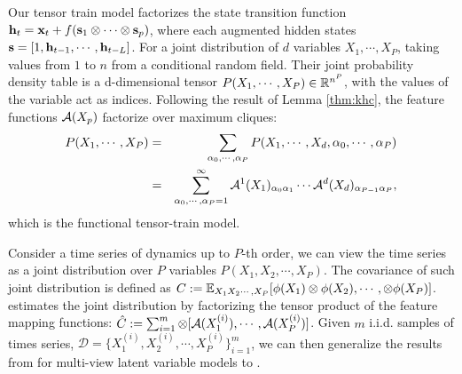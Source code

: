 
Our tensor train model factorizes the state transition function  
${\mathbf{h}}_t = {\mathbf{x}}_t+  f({\mathbf{s}}_1 \otimes \cdots \otimes {\mathbf{s}}_p)$, where each augmented hidden states ${\mathbf{s}} =  [1, {\mathbf{h}}_{t-1}, \cdots, {\mathbf{h}}_{t-L}]$. 
%
For a joint distribution of $d$ variables  $X_1, \cdots, X_P$, taking values from $1$ to $n$ from a conditional random field. Their joint probability density table is a d-dimensional tensor $P(X_1, \cdots, X_P) \in {\mathbb R}^{n^P}$, with the values of the variable act as indices. Following the result  of Lemma \ref{thm:khc},  the feature  functions  ${\mathcal{A}}(X_p)$ factorize over maximum cliques:
\begin{eqnarray*}
P(X_1,\cdots, X_P)&=& \sum_{\alpha_0, \cdots, \alpha_P}P(X_1,\cdots,X_d,\alpha_0,\cdots, \alpha_P)\\
&=& \sum_{\alpha_0,\cdots,\alpha_P=1}^\infty
%
\T{A}^1 (X_1)_{\alpha_0 \alpha_1}
%
\cdots
%
\T{A}^d(X_d)_{\alpha_{P-1}	 \alpha_P},
\end{eqnarray*}
which is the functional tensor-train model.




Consider a time series of dynamics up to $P$-th order,  we can view the time series as a joint distribution over  $P$ variables  $P(X_1, X_2, \cdots, X_P)$.   The covariance of such joint distribution is defined as  $C := {\mathbb E}_{X_1 X_2 \cdots,  X_P}[\phi(X_1)\otimes \phi(X_2), \cdots, \otimes \phi(X_P)]$. \trnn{} estimates the joint distribution by factorizing the  tensor product of the feature mapping functions: $\hat{C} := \sum_{i=1}^m \otimes [{\mathcal{A}}(X^{(i)}_1), \cdots ,{\mathcal{A}}(X^{(i)}_P)] $.   Given $m$ i.i.d. samples of times series, $\mathcal{D} = \{{X}_1^{(i)}, {X}_2^{(i)}, \cdots, {X}_P^{(i)} \}_{i=1}^m$, we can then generalize the results from \cite{song2013nonparametric} for multi-view latent variable models to \trnn{}.

